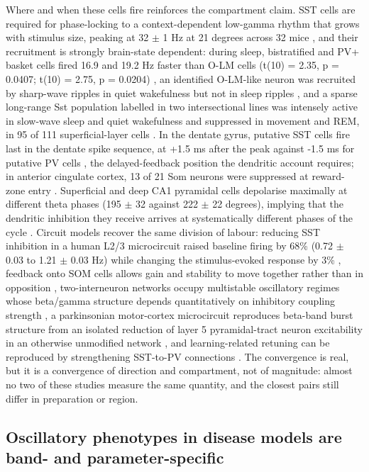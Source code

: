 \documentclass[11pt]{article}
\begin{document}
Where and when these cells fire reinforces the compartment claim. SST cells are required for phase-locking to a context-dependent low-gamma rhythm that grows with stimulus size, peaking at 32 $\pm$ 1 Hz at 21 degrees across 32 mice \citep{Veit2017}, and their recruitment is strongly brain-state dependent: during sleep, bistratified and PV+ basket cells fired 16.9 and 19.2 Hz faster than O-LM cells (t(10) = 2.35, p = 0.0407; t(10) = 2.75, p = 0.0204) \citep{Katona2014}, an identified O-LM-like neuron was recruited by sharp-wave ripples in quiet wakefulness but not in sleep ripples \citep{Katona2017}, and a sparse long-range Sst population labelled in two intersectional lines was intensely active in slow-wave sleep and quiet wakefulness and suppressed in movement and REM, in 95 of 111 superficial-layer cells \citep{Ratliff2026}. In the dentate gyrus, putative SST cells fire last in the dentate spike sequence, at +1.5 ms after the peak against -1.5 ms for putative PV cells \citep{Hainmueller2026}, the delayed-feedback position the dendritic account requires; in anterior cingulate cortex, 13 of 21 Som neurons were suppressed at reward-zone entry \citep{Kvitsiani2013}. Superficial and deep CA1 pyramidal cells depolarise maximally at different theta phases (195 $\pm$ 32 against 222 $\pm$ 22 degrees), implying that the dendritic inhibition they receive arrives at systematically different phases of the cycle \citep{SanchezAguilera2021}. Circuit models recover the same division of labour: reducing SST inhibition in a human L2/3 microcircuit raised baseline firing by 68\% (0.72 $\pm$ 0.03 to 1.21 $\pm$ 0.03 Hz) while changing the stimulus-evoked response by 3\% \citep{Yao2025}, feedback onto SOM cells allows gain and stability to move together rather than in opposition \citep{Bos2025}, two-interneuron networks occupy multistable oscillatory regimes whose beta/gamma structure depends quantitatively on inhibitory coupling strength \citep{DeySarkar2026}, a parkinsonian motor-cortex microcircuit reproduces beta-band burst structure from an isolated reduction of layer 5 pyramidal-tract neuron excitability in an otherwise unmodified network \citep{Doherty2025}, and learning-related retuning can be reproduced by strengthening SST-to-PV connections \citep{Wilmes2019}. The convergence is real, but it is a convergence of direction and compartment, not of magnitude: almost no two of these studies measure the same quantity, and the closest pairs still differ in preparation or region.

\subsection{Oscillatory phenotypes in disease models are band- and parameter-specific}
\label{sec-08-oscillatory-phenotypes}
\end{document}
